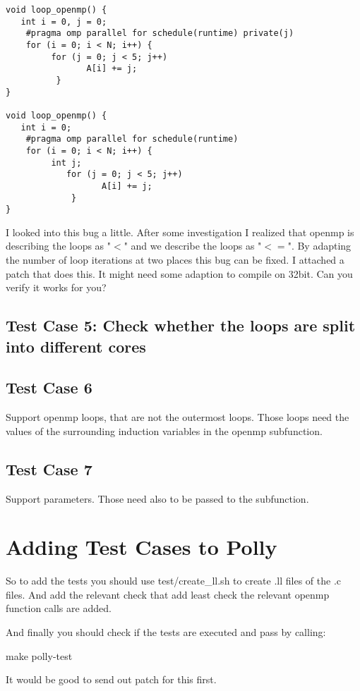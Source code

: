 \documentclass[a4paper,10pt]{article}
\begin{document}
\begin{verbatim}
void loop_openmp() {
   int i = 0, j = 0;
    #pragma omp parallel for schedule(runtime) private(j)
    for (i = 0; i < N; i++) {
         for (j = 0; j < 5; j++)
                A[i] += j;
          }
}

void loop_openmp() {
   int i = 0;
    #pragma omp parallel for schedule(runtime)
    for (i = 0; i < N; i++) {
         int j;
            for (j = 0; j < 5; j++)
                   A[i] += j;
             }
}
\end{verbatim}

I looked into this bug a little. After some investigation I realized that openmp is describing the loops as "$<$" and we describe the loops as "$<=$". By adapting the number of loop iterations at two places this bug can be fixed. I attached a patch that does this. It might need some adaption to compile on 32bit. Can you verify it works for you?
\subsection{Test Case 5: Check whether the loops are split into different cores}
\subsection{Test Case 6}

Support openmp loops, that are not the outermost loops. Those loops
need the values of the surrounding induction variables in the openmp
subfunction.

\subsection{Test Case 7}

Support parameters. Those need also to be passed to the subfunction.

\section{Adding Test Cases to Polly}
So to add the tests you should use test/create\_ll.sh to create .ll files of the .c files. And add
the relevant check that add least check the relevant openmp
function calls are added.

And finally you should check if the tests are executed and pass
by calling:

make polly-test

It would be good to send out patch for this first.
\end{document}
